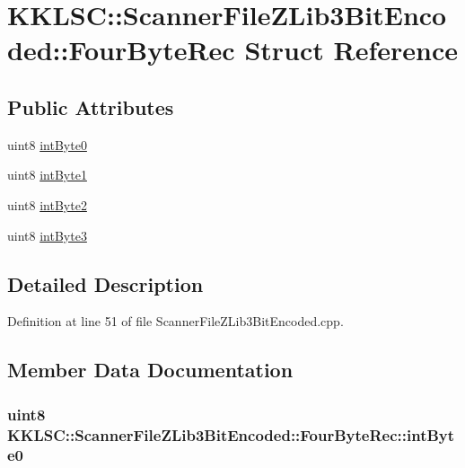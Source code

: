 \hypertarget{struct_scanner_file_z_lib3_bit_encoded_1_1_four_byte_rec}{}\section{K\+K\+L\+SC\+:\+:Scanner\+File\+Z\+Lib3\+Bit\+Encoded\+:\+:Four\+Byte\+Rec Struct Reference}
\label{struct_scanner_file_z_lib3_bit_encoded_1_1_four_byte_rec}
\subsection*{Public Attributes}
\begin{DoxyCompactItemize}
\item 
uint8 \hyperlink{struct_scanner_file_z_lib3_bit_encoded_1_1_four_byte_rec_a50cf781c81df78a7ab8fa5e52c3d692a}{int\+Byte0}
\item 
uint8 \hyperlink{struct_scanner_file_z_lib3_bit_encoded_1_1_four_byte_rec_a42a681d34b2965abf567474f3037c41f}{int\+Byte1}
\item 
uint8 \hyperlink{struct_scanner_file_z_lib3_bit_encoded_1_1_four_byte_rec_abf5bcff1858c0b968a235d41ad17ee51}{int\+Byte2}
\item 
uint8 \hyperlink{struct_scanner_file_z_lib3_bit_encoded_1_1_four_byte_rec_a7c3dd7d17e447bfe315ae19f7197e7dc}{int\+Byte3}
\end{DoxyCompactItemize}


\subsection{Detailed Description}


Definition at line 51 of file Scanner\+File\+Z\+Lib3\+Bit\+Encoded.\+cpp.



\subsection{Member Data Documentation}
\subsubsection[{\texorpdfstring{int\+Byte0}{intByte0}}]{\setlength{\rightskip}{0pt plus 5cm}uint8 K\+K\+L\+S\+C\+::\+Scanner\+File\+Z\+Lib3\+Bit\+Encoded\+::\+Four\+Byte\+Rec\+::int\+Byte0}\hypertarget{struct_scanner_file_z_lib3_bit_encoded_1_1_four_byte_rec_a50cf781c81df78a7ab8fa5e52c3d692a}{}\label{struct_scanner_file_z_lib3_bit_encoded_1_1_four_byte_rec_a50cf781c81df78a7ab8fa5e52c3d692a}



